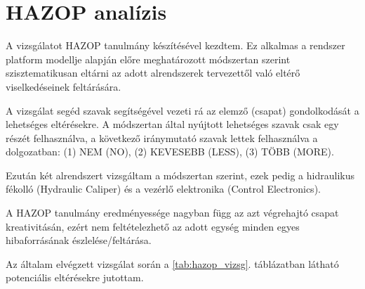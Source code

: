 \section{HAZOP analízis}
A vizsgálatot HAZOP tanulmány készítésével kezdtem.
Ez alkalmas a rendszer platform modellje alapján előre meghatározott módszertan szerint szisztematikusan eltárni az adott alrendszerek tervezettől való eltérő viselkedéseinek feltárására.

A vizsgálat segéd szavak segítségével vezeti rá az elemző (csapat) gondolkodását a lehetséges eltérésekre.
A módszertan által nyújtott lehetséges szavak csak egy részét felhasználva, a következő iránymutató szavak lettek felhasználva a dolgozatban: (1) NEM (NO), (2) KEVESEBB (LESS), (3) TÖBB (MORE).

Ezután két alrendszert vizsgáltam a módszertan szerint, ezek pedig a hidraulikus fékolló (Hydraulic Caliper) és a vezérlő elektronika (Control Electronics).

A HAZOP tanulmány eredményessége nagyban függ az azt végrehajtó csapat kreativitásán, ezért nem feltételezhető az adott egység minden egyes hibaforrásának észlelése/feltárása.

Az általam elvégzett vizsgálat során a \ref{tab:hazop_vizsg}. táblázatban látható potenciális eltérésekre jutottam.


